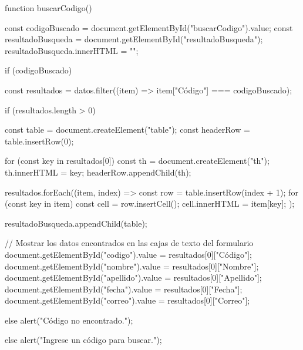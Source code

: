         function buscarCodigo() {
            const codigoBuscado = document.getElementById("buscarCodigo").value;
            const resultadoBusqueda = document.getElementById("resultadoBusqueda");
            resultadoBusqueda.innerHTML = "";

            if (codigoBuscado) {
                const resultados = datos.filter((item) => item["Código"] === codigoBuscado);

                if (resultados.length > 0) {
                    const table = document.createElement("table");
                    const headerRow = table.insertRow(0);

                    for (const key in resultados[0]) {
                        const th = document.createElement("th");
                        th.innerHTML = key;
                        headerRow.appendChild(th);
                    }

                    resultados.forEach((item, index) => {
                        const row = table.insertRow(index + 1);
                        for (const key in item) {
                            const cell = row.insertCell();
                            cell.innerHTML = item[key];
                        }
                    });

                    resultadoBusqueda.appendChild(table);

                    // Mostrar los datos encontrados en las cajas de texto del formulario
                    document.getElementById("codigo").value = resultados[0]["Código"];
                    document.getElementById("nombre").value = resultados[0]["Nombre"];
                    document.getElementById("apellido").value = resultados[0]["Apellido"];
                    document.getElementById("fecha").value = resultados[0]["Fecha"];
                    document.getElementById("correo").value = resultados[0]["Correo"];
                } else {
                    alert("Código no encontrado.");
                }
            } else {
                alert("Ingrese un código para buscar.");
            }
        }

